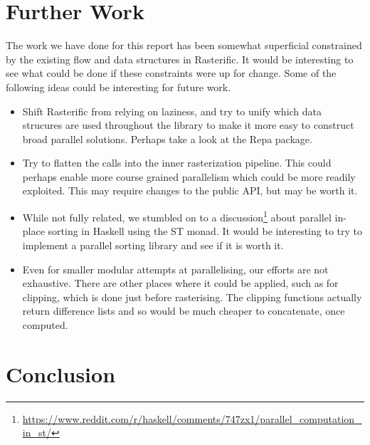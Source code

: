 \documentclass[12pt, a4paper]{article}
\begin{document}
\section{Further Work}\label{furtherwork}
The work we have done for this report has been somewhat superficial constrained by the existing flow and data structures in Rasterific.
 It would be interesting to see what could be done if these constraints were up for change. Some of the following ideas could be interesting for future work.
\begin{itemize}
\item Shift Rasterific from relying on laziness, and try to unify which data strucures are used throughout the library to make it more easy to construct
  broad parallel solutions. Perhaps take a look at the Repa package.
\item Try to flatten the calls into the inner rasterization pipeline. This could perhaps enable more course grained parallelism which could be more readily exploited.
  This may require changes to the public API, but may be worth it.
\item While not fully related, we stumbled on to a discussion\footnote{\url{https://www.reddit.com/r/haskell/comments/747zx1/parallel_computation_in_st/}}
  about parallel in-place sorting in Haskell using the ST monad.
  It would be interesting to try to implement a parallel sorting library and see if it is worth it.
  
\item Even for smaller modular attempts at parallelising, our efforts are not exhaustive. There are other places where it could be applied, such as for clipping, which is done just before rasterising. The clipping functions actually return difference lists and so would be much cheaper to concatenate, once computed.
\end{itemize}

\section{Conclusion}
\clearpage
\appendix
\end{document}
